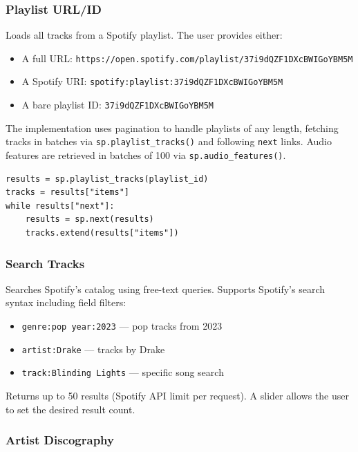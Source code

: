 \documentclass[12pt,a4paper]{article}
\begin{document}
\subsubsection{Playlist URL/ID}

Loads all tracks from a Spotify playlist. The user provides either:
\begin{itemize}[noitemsep]
    \item A full URL: \texttt{https://open.spotify.com/playlist/37i9dQZF1DXcBWIGoYBM5M}
    \item A Spotify URI: \texttt{spotify:playlist:37i9dQZF1DXcBWIGoYBM5M}
    \item A bare playlist ID: \texttt{37i9dQZF1DXcBWIGoYBM5M}
\end{itemize}

The implementation uses pagination to handle playlists of any length, fetching tracks in batches via \texttt{sp.playlist\_tracks()} and following \texttt{next} links. Audio features are retrieved in batches of 100 via \texttt{sp.audio\_features()}.

\begin{lstlisting}[style=pythonstyle, caption={Playlist track retrieval (simplified)}]
results = sp.playlist_tracks(playlist_id)
tracks = results["items"]
while results["next"]:
    results = sp.next(results)
    tracks.extend(results["items"])
\end{lstlisting}

\subsubsection{Search Tracks}

Searches Spotify's catalog using free-text queries. Supports Spotify's search syntax including field filters:

\begin{itemize}[noitemsep]
    \item \texttt{genre:pop year:2023} --- pop tracks from 2023
    \item \texttt{artist:Drake} --- tracks by Drake
    \item \texttt{track:Blinding Lights} --- specific song search
\end{itemize}

Returns up to 50 results (Spotify API limit per request). A slider allows the user to set the desired result count.

\subsubsection{Artist Discography}
\end{document}
